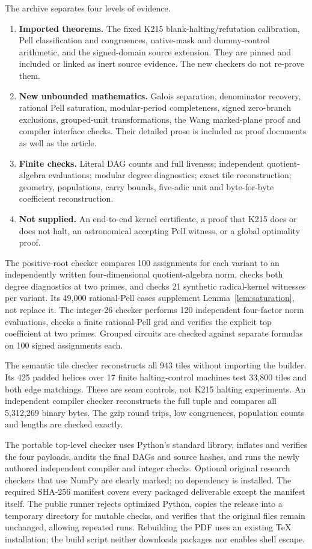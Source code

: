 \documentclass[11pt]{article}
\begin{document}
The archive separates four levels of evidence.
\begin{enumerate}
\item \textbf{Imported theorems.} The fixed K215 blank-halting/refutation calibration, Pell classification and congruences, native-mask and dummy-control arithmetic, and the signed-domain source extension. They are pinned and included or linked as inert source evidence. The new checkers do not re-prove them.
\item \textbf{New unbounded mathematics.} Galois separation, denominator recovery, rational Pell saturation, modular-period completeness, signed zero-branch exclusions, grouped-unit transformations, the Wang marked-plane proof and compiler interface checks. Their detailed prose is included as proof documents as well as the article.
\item \textbf{Finite checks.} Literal DAG counts and full liveness; independent quotient-algebra evaluations; modular degree diagnostics; exact tile reconstruction; geometry, populations, carry bounds, five-adic unit and byte-for-byte coefficient reconstruction.
\item \textbf{Not supplied.} An end-to-end kernel certificate, a proof that K215 does or does not halt, an astronomical accepting Pell witness, or a global optimality proof.
\end{enumerate}

The positive-root checker compares 100 assignments for each variant to an independently written four-dimensional quotient-algebra norm, checks both degree diagnostics at two primes, and checks 21 synthetic radical-kernel witnesses per variant. Its 49,000 rational-Pell cases supplement Lemma~\ref{lem:saturation}, not replace it. The integer-26 checker performs 120 independent four-factor norm evaluations, checks a finite rational-Pell grid and verifies the explicit top coefficient at two primes. Grouped circuits are checked against separate formulas on 100 signed assignments each.

The semantic tile checker reconstructs all 943 tiles without importing the builder. Its 425 padded helices over 17 finite halting-control machines test 33,800 tiles and both edge matchings. These are seam controls, not K215 halting experiments. An independent compiler checker reconstructs the full tuple and compares all 5,312,269 binary bytes. The gzip round trips, low congruences, population counts and lengths are checked exactly.

The portable top-level checker uses Python's standard library, inflates and verifies the four payloads, audits the final DAGs and source hashes, and runs the newly authored independent compiler and integer checks. Optional original research checkers that use NumPy are clearly marked; no dependency is installed. The required SHA-256 manifest covers every packaged deliverable except the manifest itself. The public runner rejects optimized Python, copies the release into a temporary directory for mutable checks, and verifies that the original files remain unchanged, allowing repeated runs. Rebuilding the PDF uses an existing TeX installation; the build script neither downloads packages nor enables shell escape.
\end{document}
